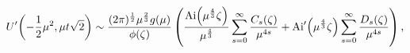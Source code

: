 \[\mathop{U\/}\nolimits'\!\left(-\frac{1}{2}\mu^{2},\mu t\sqrt{2}\right)\sim%
\frac{(2\pi)^{\frac{1}{2}}\mu^{\frac{2}{3}}g(\mu)}{\phi(\zeta)}\*\left(\frac{%
\mathop{\mathrm{Ai}\/}\nolimits\!\left(\mu^{\frac{4}{3}}\zeta\right)}{\mu^{%
\frac{4}{3}}}\sum_{s=0}^{\infty}\frac{C_{s}(\zeta)}{\mu^{4s}}+\mathop{\mathrm{%
Ai}\/}\nolimits'\!\left(\mu^{\frac{4}{3}}\zeta\right)\sum_{s=0}^{\infty}\frac{%
D_{s}(\zeta)}{\mu^{4s}}\right),\]